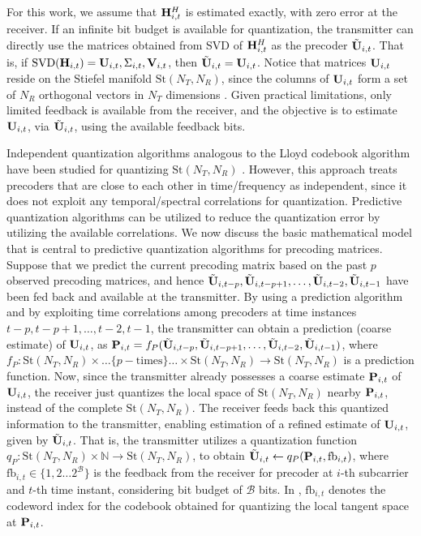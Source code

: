 \documentclass[conference]{IEEEtran}
\begin{document}
For this work, we assume that ${\bf H}^{H}_{i,t}$ is estimated exactly, with zero error at the receiver.
If an infinite bit budget is available for quantization, the transmitter can directly use the matrices obtained from SVD of ${\bf H}^{H}_{i,t}$ as the precoder $\tilde{{\bf U}}_{i,t}$. 
That is, if $\text{SVD}({\bf H}_{i,t}) = {\bf U}_{i,t},\Sigma_{i,t}, {\bf V}_{i,t}$, then $\tilde{{\bf U}}_{i,t} = {\bf U}_{i,t}$.
Notice that matrices ${\bf U}_{i,t}$ reside on the Stiefel manifold $\text{St}(N_T,N_R)$, since the columns of ${\bf U}_{i,t}$ form a set of $N_R$ orthogonal vectors in $N_T$ dimensions \cite{Gupt1905:Predictive,6891198}.
Given practical limitations, only limited feedback is available from the receiver, and the objective is to estimate ${\bf U}_{i,t}$, via $\tilde{{\bf U}}_{i,t}$, using the available feedback bits.

Independent quantization algorithms analogous to the Lloyd codebook algorithm have been studied for quantizing $\text{St}(N_T,N_R)$ \cite{6678348}.
However, this approach treats precoders that are close to each other in time/frequency as independent, since it does not exploit any temporal/spectral correlations for quantization.
Predictive quantization algorithms \cite{Gupt1905:Predictive,6891198} can be utilized to reduce the quantization error by utilizing the available correlations.
We now discuss the basic mathematical model that is central to predictive quantization algorithms for precoding matrices.
Suppose that we predict the current precoding matrix based on the past $p$ observed precoding matrices, and hence $\tilde{{\bf U}}_{i,t-p},\tilde{{\bf U}}_{i,t-p+1},\ldots,\tilde{{\bf U}}_{i,t-2},\tilde{{\bf U}}_{i,t-1}$ have been fed back and available at the transmitter.
By using a prediction algorithm and by exploiting time correlations among precoders at time instances $t-p,t-p+1,\ldots,t-2,t-1$, the transmitter can obtain a prediction (coarse estimate) of ${\bf U}_{i,t}$, as ${\bf P}_{i,t}=f_P(\tilde{{\bf U}}_{i,t-p},\tilde{{\bf U}}_{i,t-p+1},\ldots,\tilde{{\bf U}}_{i,t-2},\tilde{{\bf U}}_{i,t-1})$, where $f_P: \text{St}(N_T,N_R)\times\ldots\{p-\text{times}\}\ldots\times\text{St}(N_T,N_R) \to \text{St}(N_T,N_R)$ is a prediction function.
Now, since the transmitter already possesses a coarse estimate ${\bf P}_{i,t}$ of ${\bf U}_{i,t}$, the receiver just quantizes the local space of $\text{St}(N_T,N_R)$ nearby ${\bf P}_{i,t}$, instead of the complete $\text{St}(N_T,N_R)$. The receiver feeds back this quantized information to the transmitter, enabling estimation of a refined estimate of ${\bf U}_{i,t}$, given by $\tilde{{\bf U}}_{i,t}$.
That is, the transmitter utilizes a quantization function $q_P:\text{St}(N_T,N_R) \times \mathbb{N} \to \text{St}(N_T,N_R)$, to obtain $\tilde{{\bf U}}_{i,t} \gets q_P({\bf P}_{i,t},\text{fb}_{i,t})$, where $\text{fb}_{i,t} \in \{1,2\ldots2^{\mathcal{B}}\}$ is the feedback from the receiver for precoder at $i$-th subcarrier and $t$-th time instant, considering bit budget of $\mathcal{B}$ bits.
In \cite{Gupt1905:Predictive,6891198,6545375}, $\text{fb}_{i,t}$ denotes the codeword index for the codebook obtained for quantizing the local tangent space at ${\bf P}_{i,t}$.
\end{document}
